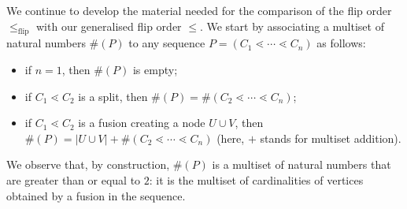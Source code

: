 \documentclass{article}
\theoremstyle{plain}
\theoremstyle{definition}
\begin{document}
We continue to develop the material needed for the comparison of the flip order $\leq_{\operatorname{flip}}$ with our generalised flip order $\leq$. We start by associating a multiset of natural numbers $\#(P)$ to any sequence
$P=(C_1\lessdot \cdots \lessdot C_n)$ as follows:
\begin{itemize}
\item if $n=1$, then $\#(P)$ is empty;
\item if $C_1\lessdot C_2$ is a split, then $\#(P)=\#(C_2\lessdot \cdots \lessdot C_n)$;
\item if $C_1\lessdot C_2$ is a fusion creating a node $U\cup V$, then $\#(P)=|U\cup V| +\#(C_2\lessdot \cdots \lessdot C_n)$ (here, $+$ stands for multiset addition).
\end{itemize}
We observe that, by construction, $\#(P)$ is a multiset of natural numbers that are greater than or equal to $2$: it is the multiset of cardinalities of vertices obtained by a fusion in the sequence. 
\end{document}
